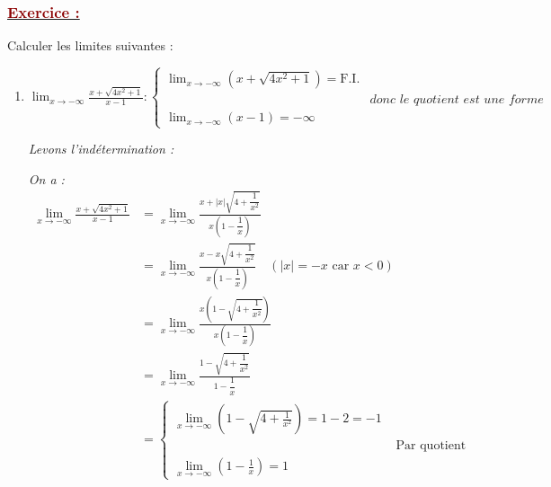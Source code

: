 \documentclass[12pt,a4paper]{article}
\begin{document}
\subsubsection*{\underline{\textcolor{darkred}{ Exercice : }}}

Calculer les limites suivantes :


\begin{enumerate}
    \item 
    $
    \displaystyle \lim_{x \to -\infty} \frac{x + \sqrt{4x^2 + 1}}{x - 1}:
    \begin{cases}
    \displaystyle \lim_{x \to -\infty} (x + \sqrt{4x^2 + 1}) = \text{F.I.}\\[3mm]
    &\textit{donc le quotient est une forme indéterminée.}\\
    \displaystyle \lim_{x \to -\infty} (x - 1) = -\infty
    \end{cases}
    $

    \textit{Levons l'indétermination :}
    
    \textit{On a :}
    \begin{align*}
        \displaystyle \lim_{x \to -\infty} \frac{x + \sqrt{4x^2 + 1}}{x - 1} &= \lim_{x \to -\infty} \frac{x + |x|\sqrt{4 + \dfrac{1}{x^2}}}{x\left(1 - \dfrac{1}{x}\right)} \\
        &= \lim_{x \to -\infty} \frac{x - x\sqrt{4 + \dfrac{1}{x^2}}}{x\left(1 - \dfrac{1}{x}\right)} \quad (|x| = -x \text{ car } x < 0) \\
        &= \lim_{x \to -\infty} \frac{x\left(1 - \sqrt{4 + \dfrac{1}{x^2}}\right)}{x\left(1 - \dfrac{1}{x}\right)} \\
        &= \lim_{x \to -\infty} \frac{1 - \sqrt{4 + \dfrac{1}{x^2}}}{1 - \dfrac{1}{x}} \\
        &= \begin{cases}
    \displaystyle \lim_{x \to -\infty} \left(1 - \sqrt{4 + \frac{1}{x^2}}\right) = 1 - 2 = -1 \\[3mm]
    &\text{ Par quotient }\\
    \displaystyle \lim_{x \to -\infty} \left(1 - \frac{1}{x}\right) = 1
    \end{cases}
    \end{align*}
    
    \vspace{0.2cm}
    
     

    \vspace{0.6cm}


\end{enumerate}
\end{document}

